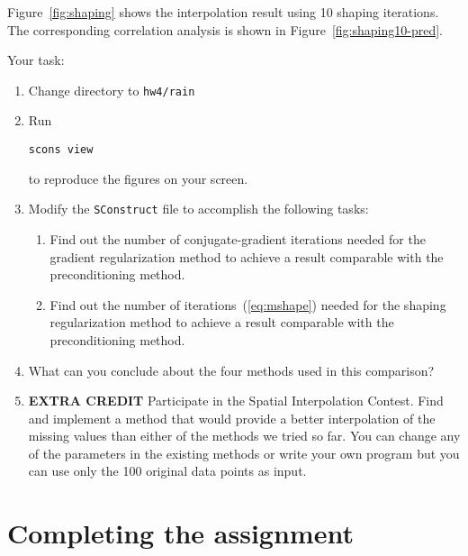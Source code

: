 Figure~\ref{fig:shaping} shows the interpolation result using
10 shaping iterations. The corresponding correlation analysis is shown
in Figure~\ref{fig:shaping10-pred}.



Your task:
\begin{enumerate}
\item Change directory to \texttt{hw4/rain}
\item Run 
\begin{verbatim}
scons view
\end{verbatim}
to reproduce the figures on your screen.
\item Modify the \texttt{SConstruct} file to accomplish the following
  tasks:
\begin{enumerate}
\item Find out 
the number of conjugate-gradient iterations needed for the gradient regularization method to achieve a result 
 comparable with the preconditioning method.
\item Find out 
the number of iterations~(\ref{eq:mshape}) needed for the shaping regularization method to achieve a result 
 comparable with the preconditioning method.
\end{enumerate}
\item What can you conclude about the four methods used in this comparison?
\item \textbf{EXTRA CREDIT} Participate in the Spatial Interpolation Contest. Find and
implement a method that would provide a better interpolation of the
missing values than either of the methods we tried so far. You can
change any of the parameters in the existing methods or write your own
program but you can use only the 100 original data points as input.
\end{enumerate}

\lstset{language=c,numbers=left,numberstyle=\tiny,showstringspaces=false}


\lstset{language=python,numbers=left,numberstyle=\tiny,showstringspaces=false}


\section{Completing the assignment}

